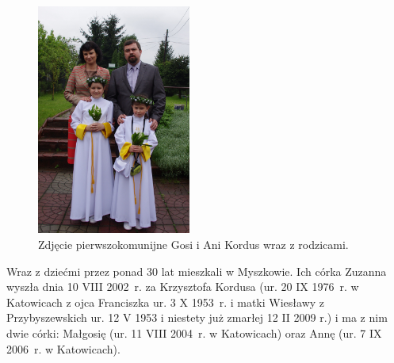 \begin{figure}[!h]
\begin{center}
\includegraphics[width=0.45\textwidth, angle=90]{zdjecia/komunia_gosi_i_ani_kordus.jpg}
\caption[Pierwsza komunia św. Gosi i Ani Kordus]{Zdjęcie pierwszokomunijne Gosi i Ani Kordus wraz z rodzicami.}
\label{rys:komunia_gosi_i_ani_kordus}
\end{center}
\end{figure}

Wraz z dziećmi przez ponad 30 lat mieszkali w Myszkowie. Ich córka Zuzanna wyszła dnia 10 VIII 2002~r. za Krzysztofa Kordusa (ur. 20 IX 1976~r. w Katowicach z ojca Franciszka ur. 3 X 1953~r. i matki Wiesławy z Przybyszewskich ur. 12 V 1953 i niestety już zmarłej 12 II 2009 r.) i ma z nim dwie córki: Małgosię (ur. 11 VIII 2004~r. w Katowicach) oraz Annę (ur. 7 IX 2006~r. w Katowicach).


